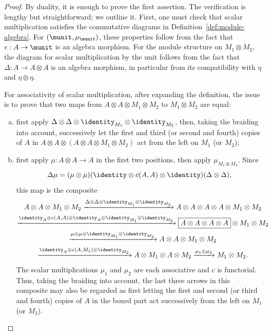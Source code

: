 \begin{proof}
	By duality, it is enough to prove the first assertion. The verification is
	lengthy but straightforward; we outline it. First, one must check that
	scalar multiplication satisfies the commutative diagrams in
	Definition~\ref{def:module-algebra}. For $(\munit,\mu_{\munit})$, these
	properties follow from the fact that $\epsilon:A\to\munit$ is an algebra
	morphism. For the module structure on $M_1\otimes M_2$, the diagram for
	scalar multiplication by the unit follows from the fact that
	$\Delta:A\to A\otimes A$ is an algebra morphism, in particular from its
	compatibility with $\eta$ and $\eta\otimes\eta$.

	For associativity of scalar multiplication, after expanding the
	definition, the issue is to prove that two maps from
	$A\otimes A\otimes M_1\otimes M_2$ to $M_1\otimes M_2$ are equal:
	\begin{enumerate}[(a)]
		\item first apply
		$\Delta\otimes\Delta\otimes\identity_{M_1}\otimes\identity_{M_2}$,
		then, taking the braiding into account, successively let the first and
		third (or second and fourth) copies of $A$ in
		$A\otimes A\otimes(A\otimes A\otimes M_1\otimes M_2)$ act from the
		left on $M_1$ (or $M_2$);
		\item first apply $\mu:A\otimes A\to A$ in the first two positions,
		then apply $\mu_{M_1\otimes M_2}$. Since
		\[ \Delta\mu = (\mu \otimes \mu) (\identity \otimes c(A, A) \otimes \identity)(\Delta \otimes \Delta), \]
		this map is the composite
		\begin{multline*}
			A \otimes A \otimes M_1 \otimes M_2 \xrightarrow{\Delta \otimes \Delta \otimes \identity_{M_1} \otimes \identity_{M_2}} A \otimes A \otimes A \otimes A \otimes M_1 \otimes M_2 \\
			\xrightarrow{\identity_A \otimes c(A, A) \otimes \identity_A \otimes \identity_{M_1} \otimes \identity_{M_2}} \boxed{A \otimes A \otimes A \otimes A} \otimes M_1 \otimes M_2 \\
			\xrightarrow{\mu \otimes \mu \otimes \identity_{M_1} \otimes \identity_{M_2}} A \otimes A \otimes M_1 \otimes M_2 \\
			\xrightarrow{\identity_A \otimes c(A, M_1) \otimes \identity_{M_2}} A \otimes M_1 \otimes A \otimes M_2 \xrightarrow{\mu_1 \otimes \mu_2} M_1 \otimes M_2.
		\end{multline*}
		The scalar multiplications $\mu_1$ and $\mu_2$ are each associative and
		$c$ is functorial. Thus, taking the braiding into account, the last
		three arrows in this composite may also be regarded as first letting
		the first and second (or third and fourth) copies of $A$ in the boxed
		part act successively from the left on $M_1$ (or $M_2$).
	\end{enumerate}


\end{proof}
